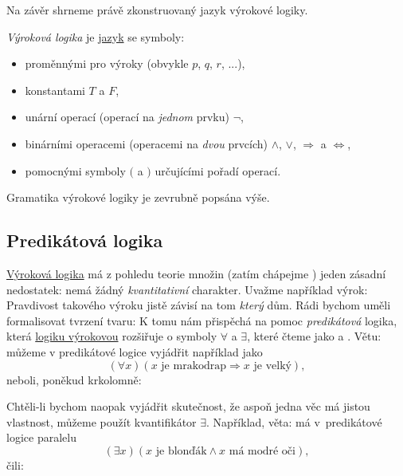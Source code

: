Na závěr shrneme právě zkonstruovaný jazyk výrokové logiky.

\begin{definition}
  \label{def:vyrokova-logika}
  \emph{Výroková logika} je \hyperref[def:jazyk]{jazyk} se symboly:
  \begin{itemize}
    \item proměnnými pro výroky (obvykle $p$, $q$, $r$, ...),
    \item konstantami $T$ a $F$,
    \item unární operací (operací na \emph{jednom} prvku) $\neg $,
    \item binárními operacemi (operacemi na \emph{dvou} prvcích) $ \wedge $, $
      \vee $, $ \Rightarrow $ a $ \Leftrightarrow $,
    \item pomocnými symboly $($ a $)$ určujícími pořadí operací.
  \end{itemize}
  Gramatika výrokové logiky je zevrubně popsána výše.
\end{definition}

\subsection{Predikátová logika}
\label{ssec:predikatova-logika}

\hyperref[def:vyrokova-logika]{Výroková logika} má z pohledu teorie množin
(zatím chápejme ) jeden zásadní nedostatek: nemá žádný
\emph{kvantitativní} charakter. Uvažme například výrok: 
Pravdivost takového výroku jistě závisí na tom \emph{který} dům. Rádi bychom
uměli formalisovat tvrzení tvaru:  K tomu
nám přispěchá na pomoc \emph{predikátová} logika, která
\hyperref[def:vyrokova-logika]{logiku výrokovou} rozšiřuje o symboly $ \forall $
a $ \exists $, které čteme jako  a . Větu:  můžeme v predikátové logice vyjádřit například jako
\begin{equation}
  \label{eq:predikat-mrakodrap}
  ( \forall x)(x \text{ je mrakodrap} \Rightarrow x \text{ je velký}),
\end{equation}
neboli, poněkud krkolomně: 

Chtěli-li bychom naopak vyjádřit skutečnost, že aspoň jedna věc má jistou
vlastnost, můžeme použít kvantifikátor $ \exists $. Například, věta:  má v~predikátové logice paralelu
\begin{equation}
  \label{eq:predikat-blondak}
  ( \exists x)(x \text{ je blonďák} \wedge x \text{ má modré oči}),
\end{equation}
čili: 

